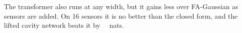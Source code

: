 The transformer also runs at any width, but it gains less over FA-Gaussian as sensors are added. On 16 sensors it is
no better than the closed form, and the lifted cavity network beats it by \SFThreegainpfn\ \SFThreegainpfnci\ nats.
